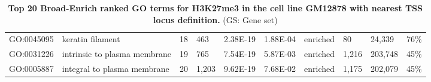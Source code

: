 \begin{sidewaystable}[!ht]
\begin{tabular}{lp{2cm}p{1cm}p{1cm}p{1.25cm}p{1.25cm}p{1cm}p{1.25cm}p{1.25cm}p{1.25cm}}
GO:0045095     & keratin filament                   & 18                         & 463                 & 2.38E-19                      & 1.88E-04               & enriched        & 80                   & 24,339                 & 76\%                     \\
GO:0031226     & intrinsic to plasma membrane       & 19                         & 765                 & 7.54E-19                      & 5.87E-03               & enriched        & 1,216                & 203,748                & 45\%                     \\
GO:0005887     & integral to plasma membrane        & 20                         & 1,203               & 9.62E-19                      & 7.68E-02               & enriched        & 1,175                & 202,079                & 45\%
\end{tabular}
\normalsize
\caption[Top 20 Broad-Enrich ranked GO terms for H3K27me3 in the cell line GM12878 with nearest TSS locus definition.]
{
\textbf{Top 20 Broad-Enrich ranked GO terms for H3K27me3 in the cell line GM12878 with nearest TSS locus definition.}
(GS: Gene set)
}
\label{chap2:table:9}

\end{sidewaystable}

\newpage

